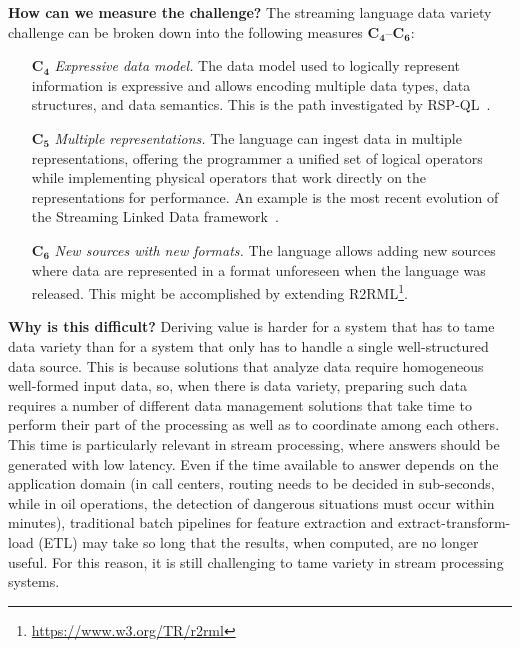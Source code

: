 \textbf{How can we measure the challenge?}
%
The streaming language data variety challenge can be broken down
into the following measures $\mathbf{C_4}$--$\mathbf{C_6}$:

\begin{itemize}[leftmargin=6mm]
  \item[$\mathbf{C_4}$] \emph{Expressive data model.}  The data model
    used to logically represent information is expressive and allows
    encoding multiple data types, data structures, and data
    semantics. This is the path investigated by
    RSP-QL~\cite{DellAglioDataScience2017,DBLP:conf/debs/ValleDM16}.
  \item[$\mathbf{C_5}$] \emph{Multiple representations.} The language
    can ingest data in multiple representations, offering the
    programmer a unified set of logical operators while implementing
    physical operators that work directly on the representations for
    performance. An example is the most recent evolution of the
    Streaming Linked Data framework~\cite{DBLP:conf/esws/BalduiniV017a}.
  \item[$\mathbf{C_6}$] \emph{New sources with new formats.} The
    language allows adding new sources where data are represented in a
    format unforeseen when the language was
    released. This might be accomplished by extending
    R2RML\footnote{\url{https://www.w3.org/TR/r2rml}}.
\end{itemize}

\textbf{Why is this difficult?}
%
Deriving value is harder for a system that has to tame data variety
than for a system that only has to handle a single well-structured
data source. This is because solutions that analyze data require
homogeneous well-formed input data, so, when there is data variety,
preparing such data requires a number of different data management solutions that take time to
perform their part of the processing as well as to coordinate among each others. This time is particularly relevant in stream
processing, where answers should be generated with low latency. Even
if the time available to answer depends on the application domain (in
call centers, routing needs to be decided in sub-seconds, while in oil
operations, the detection of dangerous situations must occur within
minutes), traditional batch pipelines for feature extraction and
extract-transform-load (ETL) may take so long that the results, when
computed, are no longer useful. For this reason, it is still
challenging to tame variety in stream processing systems.
